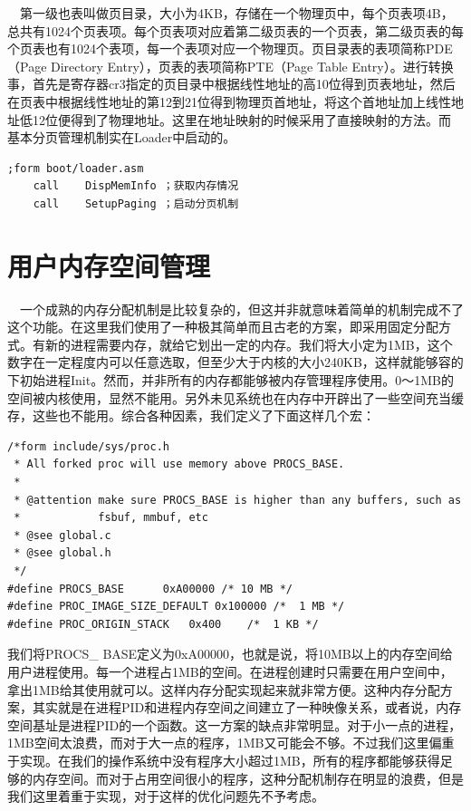 \documentclass[UTF8,nofonts,cs4size]{ctexrep}
\begin{document}
\indent \ \ 
第一级也表叫做页目录，大小为4KB，存储在一个物理页中，每个页表项4B，总共有1024个页表项。每个页表项对应着第二级页表的一个页表，第二级页表的每个页表也有1024个表项，每一个表项对应一个物理页。页目录表的表项简称PDE（Page Directory Entry），页表的表项简称PTE（Page Table Entry）。进行转换事，首先是寄存器cr3指定的页目录中根据线性地址的高10位得到页表地址，然后在页表中根据线性地址的第12到21位得到物理页首地址，将这个首地址加上线性地址低12位便得到了物理地址。这里在地址映射的时候采用了直接映射的方法。而
基本分页管理机制实在Loader中启动的。
\begin{lstlisting}
;form boot/loader.asm
	call	DispMemInfo ；获取内存情况
	call	SetupPaging ；启动分页机制
\end{lstlisting}
\section{用户内存空间管理}
\indent \ \ 
一个成熟的内存分配机制是比较复杂的，但这并非就意味着简单的机制完成不了这个功能。在这里我们使用了一种极其简单而且古老的方案，即采用固定分配方式。有新的进程需要内存，就给它划出一定的内存。我们将大小定为1MB，这个数字在一定程度内可以任意选取，但至少大于内核的大小240KB，这样就能够容的下初始进程Init。然而，并非所有的内存都能够被内存管理程序使用。0～1MB的空间被内核使用，显然不能用。另外未见系统也在内存中开辟出了一些空间充当缓存，这些也不能用。综合各种因素，我们定义了下面这样几个宏：
\begin{lstlisting}
/*form include/sys/proc.h
 * All forked proc will use memory above PROCS_BASE.
 *
 * @attention make sure PROCS_BASE is higher than any buffers, such as
 *            fsbuf, mmbuf, etc
 * @see global.c
 * @see global.h
 */
#define	PROCS_BASE		0xA00000 /* 10 MB */
#define	PROC_IMAGE_SIZE_DEFAULT	0x100000 /*  1 MB */
#define	PROC_ORIGIN_STACK	0x400    /*  1 KB */
\end{lstlisting}
我们将PROCS\_ BASE定义为0xA00000，也就是说，将10MB以上的内存空间给用户进程使用。每一个进程占1MB的空间。在进程创建时只需要在用户空间中，拿出1MB给其使用就可以。这样内存分配实现起来就非常方便。这种内存分配方案，其实就是在进程PID和进程内存空间之间建立了一种映像关系，或者说，内存空间基址是进程PID的一个函数。这一方案的缺点非常明显。对于小一点的进程，1MB空间太浪费，而对于大一点的程序，1MB又可能会不够。不过我们这里偏重于实现。在我们的操作系统中没有程序大小超过1MB，所有的程序都能够获得足够的内存空间。而对于占用空间很小的程序，这种分配机制存在明显的浪费，但是我们这里着重于实现，对于这样的优化问题先不予考虑。
\end{document}

